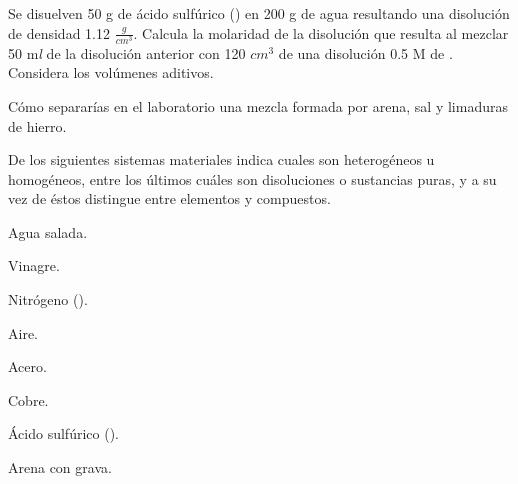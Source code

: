 \documentclass[11pt]{article}
\begin{document}
\begin{question}{0.5}
Se disuelven 50 g de ácido sulfúrico () en 200 g de agua resultando una disolución de densidad 1.12 $\frac{g}{cm^3}$.
Calcula la molaridad de la disolución que resulta al mezclar 50 {m\it l} de la disolución anterior con 120 ${cm^3}$ de una disolución 0.5 M de . Considera los volúmenes aditivos.
\end{question}
\begin{solution}
\end{solution}%
\begin{problem}[10]
Cómo separarías en el laboratorio una mezcla formada por arena, sal y limaduras de hierro.

\dotfill\par\dotfill\par\dotfill\par\dotfill\par\dotfill\par
\begin{solution}
\phantom{}
\end{solution}
\end{problem}
\begin{problem*}[2ea]
De los siguientes sistemas materiales indica cuales son heterogéneos u homogéneos, entre los últimos cuáles son disoluciones o sustancias puras, y a su vez de éstos distingue entre elementos y compuestos.
\begin{multicols}{2} 
	 \begin{parts}
		\item Agua salada.\dotfill \par
		 \dotfill
		\item Vinagre.\dotfill \par
		 \dotfill
		\item Nitrógeno ().\dotfill \par
		 \dotfill
		\item Aire.\dotfill \par
		 \dotfill
		\item Acero.\dotfill \par
		 \dotfill
		\item Cobre.\dotfill \par
		 \dotfill
		\item Ácido sulfúrico ().\dotfill \par
		 \dotfill
		\item Arena con grava.\dotfill \par
		 \dotfill
\end{parts}
	\end{multicols} 
\end{problem*}
\end{document}
